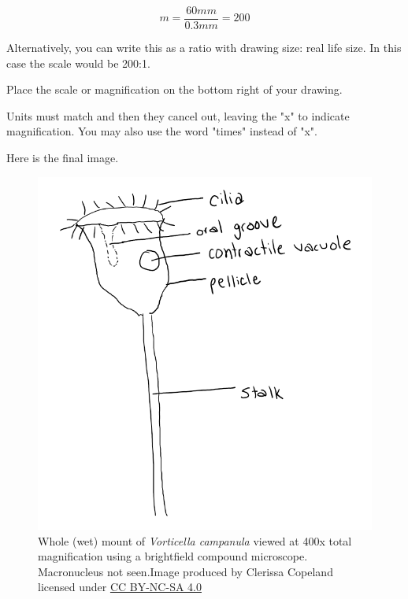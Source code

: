 \documentclass[
]{book}
\begin{document}
\[m = \frac{60mm}{0.3mm} = 200\]

Alternatively, you can write this as a ratio with drawing size: real life size. In this case the scale would be 200:1.

Place the scale or magnification on the bottom right of your drawing.

Units must match and then they cancel out, leaving the "x" to indicate magnification. You may also use the word "times" instead of "x".

Here is the final image.

\begin{figure}
\centering
\includegraphics{images/DM_final-image.png}
\caption{Whole (wet) mount of \emph{Vorticella campanula} viewed at 400x total magnification using a brightfield compound microscope. Macronucleus not seen.Image produced by Clerissa Copeland licensed under \href{https://creativecommons.org/licenses/by-nc-sa/4.0/}{CC BY-NC-SA 4.0}}
\end{figure}
\end{document}
